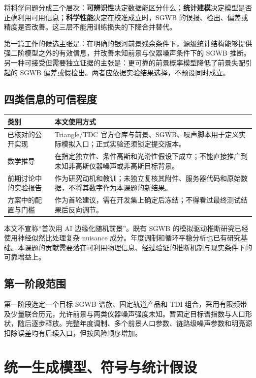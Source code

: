 \documentclass[UTF8,fontset=fandol,a4paper,11pt]{ctexart}
\numberwithin{equation}{section}
\begin{document}
将科学问题分成三个层次：\textbf{可辨识性}决定数据能区分什么；\textbf{统计建模}决定模型是否正确利用可用信息；\textbf{科学性能}决定在校准成立时，SGWB 的误报、检出、偏差或精度是否改善。这三层不能用训练损失的下降合并替代。

第一篇工作的候选主张是：在明确的银河前景残余条件下，源级统计结构能够提供强二阶模型之外的有效信息，并改善未知前景与仪器噪声条件下的 SGWB 推断。另一种可接受但需要独立证据的主张是：更可靠的前景概率模型降低了前景失配引起的 SGWB 偏差或假检出。两者应依据实验结果选择，不预设同时成立。

\subsection{四类信息的可信程度}
\noindent\begin{tabularx}{\linewidth}{P{2.7cm}Y}
\toprule
类别 & 本文使用方式\\\midrule
已核对的公开实现 & Triangle/TDC 官方仓库与前景、SGWB、噪声脚本用于定义实际模拟入口；正式实验还须锁定提交版本。\\
数学推导 & 在指定独立性、条件高斯和光滑性假设下成立；不能直接推广到未知非高斯仪器噪声或非高斯目标背景。\\
前期讨论中的实验报告 & 作为研究动机和教训；未独立复核其附件、服务器代码和原始数据，不将其数字作为本课题的新结果。\\
方案中的配置与门槛 & 作为首轮建议，需在开发集上确定后冻结；不得看过最终测试结果后反向调节。\\\bottomrule
\end{tabularx}

本文不宣称“首次用 AI 边缘化随机前景”。既有 SGWB 的模拟驱动推断研究已经使用神经似然比处理复杂 nuisance 成分\cite{saqqara}。年度调制和循环平稳分析也已有研究基础\cite{gaussianity,cyclo}。本课题的贡献需要落在可利用物理信息、经过验证的推断机制与现实条件下的可靠增益上。

\subsection{第一阶段范围}
第一阶段选定一个目标 SGWB 谱族、固定轨道产品和 TDI 组合，采用有限频带及少量联合历元，允许前景与两类仪器噪声强度未知。暂固定目标谱指数与人口形状，随后逐步释放。完整年度调制、多个前景人口参数、链路级噪声参数和明亮源扣除误差均有后续入口，但按风险顺序增加。

\section{统一生成模型、符号与统计假设}
\end{document}
